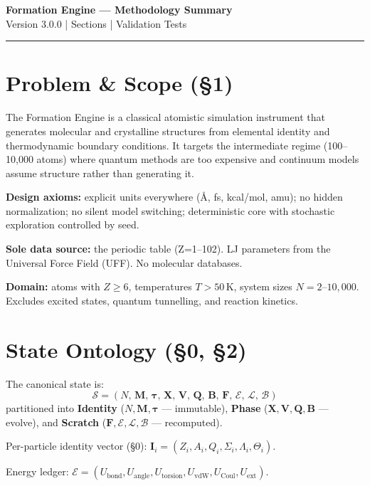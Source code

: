 \documentclass[10pt, a4paper, twocolumn]{article}
\begin{document}
\begin{center}
{\Large\bfseries Formation Engine --- Methodology Summary}\\[3pt]
{\small Version 3.0.0 \quad| Sections \quad| Validation Tests}
\end{center}
\vspace{-0.5em}\hrule\vspace{0.5em}

\section{Problem \& Scope (\S1)}

The Formation Engine is a classical atomistic simulation instrument
that generates molecular and crystalline structures from elemental
identity and thermodynamic boundary conditions.  It targets the
intermediate regime (100--10,000 atoms) where quantum methods are too
expensive and continuum models assume structure rather than
generating it.

\textbf{Design axioms:}
explicit units everywhere ({\AA}, fs, kcal/mol, amu);
no hidden normalization;
no silent model switching;
deterministic core with stochastic exploration controlled by seed.

\textbf{Sole data source:} the periodic table (Z=1--102).
LJ parameters from the Universal Force Field (UFF).
No molecular databases.

\textbf{Domain:} atoms with $Z \ge 6$, temperatures $T > 50$\,K,
system sizes $N = 2$--$10{,}000$.
Excludes excited states, quantum tunnelling, and reaction kinetics.

\section{State Ontology (\S0, \S2)}

The canonical state is:
\[
\mathcal{S} = (N,\,\mathbf{M},\,\boldsymbol{\tau},\,\mathbf{X},\,
\mathbf{V},\,\mathbf{Q},\,\mathbf{B},\,\mathbf{F},\,\mathcal{E},\,
\mathcal{L},\,\mathcal{B})
\]
partitioned into \textbf{Identity} ($N, \mathbf{M}, \boldsymbol{\tau}$
--- immutable), \textbf{Phase} ($\mathbf{X}, \mathbf{V}, \mathbf{Q},
\mathbf{B}$ --- evolve), and \textbf{Scratch} ($\mathbf{F},
\mathcal{E}, \mathcal{L}, \mathcal{B}$ --- recomputed).

Per-particle identity vector (\S0):
$\mathbf{I}_i = (Z_i, A_i, Q_i, \Sigma_i, \Lambda_i, \Theta_i)$.

Energy ledger: $\mathcal{E} = (U_\text{bond}, U_\text{angle},
U_\text{torsion}, U_\text{vdW}, U_\text{Coul}, U_\text{ext})$.
\end{document}
